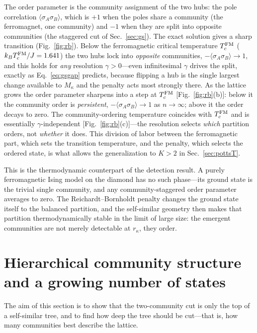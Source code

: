 \documentclass[preprint,12pt]{elsarticle}
\newcommand{\rk}{r_{\kappa}}
\begin{document}
The order parameter is the community assignment of the two hubs: the pole
correlation $\langle\sigma_A\sigma_B\rangle$, which is $+1$ when the poles share
a community (the ferromagnet, one community) and $-1$ when they are split into
opposite communities (the staggered cut of Sec.~\ref{sec:gs}). The exact
solution gives a sharp transition (Fig.~\ref{fig:rb}). Below the ferromagnetic
critical temperature $T_c^{\rm FM}$ ($k_BT_c^{\rm FM}/J=1.641$) the two hubs
lock into \emph{opposite} communities, $-\langle\sigma_A\sigma_B\rangle\to1$,
and this holds for \emph{any} resolution $\gamma>0$---even infinitesimal
$\gamma$ drives the split, exactly as Eq.~\eqref{eq:gsgap} predicts, because
flipping a hub is the single largest change available to $M_\kappa$ and the
penalty acts most strongly there. As the lattice grows the order parameter
sharpens into a step at $T_c^{\rm FM}$ [Fig.~\ref{fig:rb}(b)]: below it the
community order is \emph{persistent}, $-\langle\sigma_A\sigma_B\rangle\to1$ as
$n\to\infty$; above it the order decays to zero. The community-ordering
temperature coincides with $T_c^{\rm FM}$ and is essentially
$\gamma$-independent [Fig.~\ref{fig:rb}(c)]---the resolution selects
\emph{which} partition orders, not \emph{whether} it does. This division of
labor between the ferromagnetic part, which sets the transition temperature,
and the penalty, which selects the ordered state, is what allows the
generalization to $K>2$ in Sec.~\ref{sec:pottsT}.

This is the thermodynamic counterpart of the detection result. A purely
ferromagnetic Ising model on the diamond has no such phase---its ground state is
the trivial single community, and any community-staggered order parameter
averages to zero. The Reichardt--Bornholdt penalty changes the ground state
itself to the balanced partition, and the self-similar geometry then makes that
partition thermodynamically stable in the limit of large size: the emergent
communities are not merely detectable at $\rk$, they order.

\section{Hierarchical community structure and a growing number of states}
\label{sec:hier}

The aim of this section is to show that the two-community cut is only the top of
a self-similar tree, and to find how deep the tree should be cut---that is, how
many communities best describe the lattice.
\end{document}
